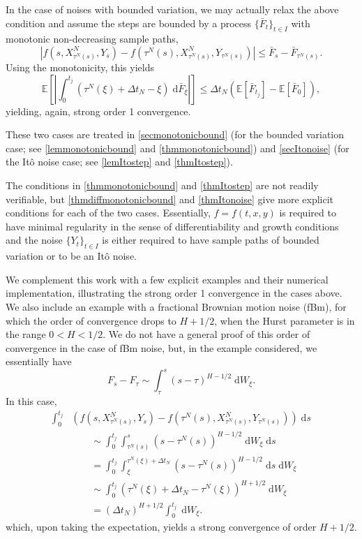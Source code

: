 \documentclass[reqno,12pt]{amsart}
\theoremstyle{plain}%
\theoremstyle{definition}
\begin{document}
In the case of noises with bounded variation, we may actually relax the above condition and assume the steps are bounded by a process $\{\bar F_t\}_{t\in I}$ with monotonic non-decreasing sample paths,
\[
    |f(s, X_{\tau^N(s)}^N, Y_s) - f(\tau^N(s), X_{\tau^N(s)}^N, Y_{\tau^N(s)})| \leq \bar F_s - \bar F_{\tau^N(s)}.
\]
Using the monotonicity, this yields
\[
    \mathbb{E}\left[\left| \int_0^{t_j} (\tau^N(\xi) + \Delta t_N - \xi) \;\mathrm{d} \bar F_\xi \right|\right] \leq \Delta t_N \left(\mathbb{E}[\bar F_{t_j}] - \mathbb{E}[\bar F_0]\right),
\]
yielding, again, strong order 1 convergence.

These two cases are treated in \cref{secmonotonicbound} (for the bounded variation case; see \cref{lemmonotonicbound} and \cref{thmmonotonicbound}) and \cref{secItonoise} (for the It\^o noise case; see \cref{lemItostep} and \cref{thmItostep}).

The conditions in \cref{thmmonotonicbound} and \cref{thmItostep} are not readily verifiable, but \cref{thmdiffmonotonicbound} and \cref{thmItonoise} give more explicit conditions for each of the two cases. Essentially, $f=f(t, x, y)$ is required to have minimal regularity in the sense of differentiability and growth conditions and the noise $\{Y_t\}_{t\in I}$ is either required to have sample paths of bounded variation or to be an It\^o noise.

We complement this work with a few explicit examples and their numerical implementation, illustrating the strong order 1 convergence in the cases above. We also include an example with a fractional Brownian motion noise (fBm), for which the order of convergence drops to $H + 1/2$, when the Hurst parameter is in the range $0 < H < 1/2$. We do not have a general proof of this order of convergence in the case of fBm noise, but, in the example considered, we essentially have
\[
    F_s - F_\tau \sim \int_\tau^s (s-\tau)^{H-1/2}\;\mathrm{d}W_\xi.
\]
In this case,
\begin{align*}
    \int_0^{t_j} & \left( f(s, X_{\tau^N(s)}^N, Y_s) - f(\tau^N(s), X_{\tau^N(s)}^N, Y_{\tau^N(s)}) \right)\;\mathrm{d}s \\ 
    & \qquad \sim \int_0^{t_j} \int_{\tau^N(s)}^s (s-\tau^N(s))^{H-1/2} \;\mathrm{d} W_\xi\;\mathrm{d}s \\
    & \qquad = \int_0^{t_j} \int_{\xi}^{\tau^N(\xi) + \Delta t_N} (s-\tau^N(s))^{H-1/2} \;\mathrm{d}s \;\mathrm{d} W_\xi \\
    & \qquad \sim \int_0^{t_j} (\tau^N(\xi) + \Delta t_N - \tau^N(\xi))^{H+1/2} \;\mathrm{d} W_\xi \\
    & \qquad = (\Delta t_N)^{H+1/2} \int_0^{t_j} \;\mathrm{d} W_\xi.
\end{align*}
which, upon taking the expectation, yields a strong convergence of order $H + 1/2$.
\end{document}
